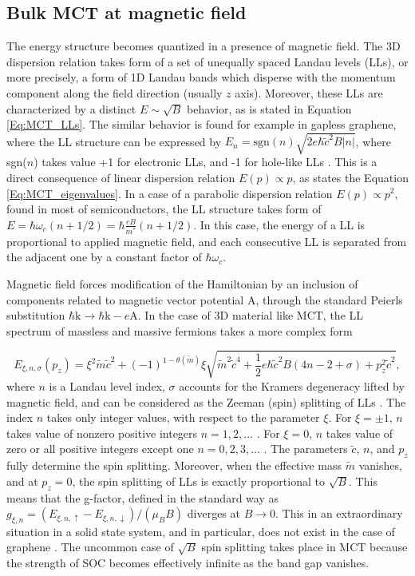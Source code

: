 \documentclass[titlepage,a4paper]{book}
\newcommand{\wciecie}{\quad\phantom{v}}
\begin{document}
\subsection{Bulk MCT at magnetic field}
\wciecie
The energy structure becomes quantized in a presence of magnetic field. The 3D dispersion relation takes form of a set of unequally spaced Landau levels (LLs), or more precisely, a form of 1D Landau bands which disperse with the momentum component along the field direction (usually $z$ axis). Moreover, these LLs are characterized by a distinct $E \sim \sqrt{B}$ behavior, as is stated in Equation \ref{Eq:MCT_LLs}. The similar behavior is found for example in gapless graphene, where the LL structure can be expressed by $E_n = \mathrm{sgn}(n) \sqrt{2e\hbar \tilde{c}^2B|n|}$, where sgn($n$) takes value +1 for electronic LLs, and -1 for hole-like LLs \cite{Jiang_MCT}. This is a direct consequence of linear dispersion relation $E(p) \propto p$, as states the Equation \ref{Eq:MCT_eigenvalues}. In a case of a parabolic dispersion relation $E(p) \propto p^2$, found in most of semiconductors, the LL structure takes form of $E = \hbar \omega_c(n + 1/2) = \hbar \frac{eB}{m^*}(n + 1/2)$. In this case, the energy of a LL is proportional to applied magnetic field, and each consecutive LL is separated from the adjacent one by a constant factor of $\hbar \omega_c$. 

Magnetic field forces modification of the Hamiltonian by an inclusion of components related to magnetic vector potential $\boldsymbol{\mathrm{A}}$, through the standard Peierls substitution $\hbar \boldsymbol{\mathrm{k}} \rightarrow \hbar\boldsymbol{\mathrm{k}} - e \boldsymbol{\mathrm{A}}$. In the case of 3D material like MCT, the LL spectrum of massless and massive fermions takes a more complex form

\begin{equation}
\label{Eq:MCT_LLs}
E_{\xi,n,\sigma }(p_z) = \xi^2 \tilde{m}\tilde{c}^2 + (-1)^{1-\theta (\tilde{m})} \xi \sqrt{\tilde{m}^2\tilde{c}^4 + \frac{1}{2}e\hbar\tilde{c}^2B (4n - 2 + \sigma) + p_z^2\tilde{c}^2},
\end{equation}
where $n$ is a Landau level index, $\sigma$ accounts for the Kramers degeneracy lifted by magnetic field, and can be considered as the Zeeman  (spin) splitting of LLs \cite{Teppe_MCT}. The index $n$ takes only integer values, with respect to the parameter $\xi$. For $\xi = \pm 1$, $n$ takes value of nonzero positive integers $n = 1,2,...$ . For $\xi = 0$, $n$ takes value of zero or all positive integers except one $n = 0,2,3,...$ . The parameters $\tilde{c}$, $n$, and $p_z$ fully determine the spin splitting. Moreover, when the effective mass $\tilde{m}$ vanishes, and at $p_z = 0$, the spin splitting of LLs is exactly proportional to $\sqrt{B}$. This means that the g-factor, defined in the standard way as $g_{\xi , n} = (E_{\xi , n , \uparrow} - E_{\xi , n , \downarrow})/(\mu_B B)$ diverges at $B \rightarrow 0$. This in an extraordinary situation in a solid state system, and in particular, does not exist in the case of graphene \cite{Orlita_MCT}. The uncommon case of $\sqrt{B}$ spin splitting takes place in MCT because the strength of SOC becomes effectively infinite as the band gap vanishes. 
\end{document}
